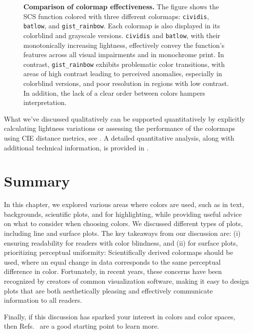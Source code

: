 \begin{figure}
	\centering
	
	\caption{\textbf{Comparison of colormap effectiveness.} The figure shows the SCS function colored with three different colormaps: \texttt{cividis}, \texttt{batlow}, and \texttt{gist\_rainbow}. Each colormap is also displayed in its colorblind and grayscale versions. \texttt{cividis} and \texttt{batlow}, with their monotonically increasing lightness, effectively convey the function's features across all visual impairments and in monochrome print. In contrast, \texttt{gist\_rainbow} exhibits problematic color transitions, with areas of high contrast leading to perceived anomalies, especially in colorblind versions, and poor resolution in regions with low contrast. In addition, the lack of a clear order between colors hampers interpretation.}
	\label{fig:sensitivityCVD}
\end{figure}

What we've discussed qualitatively can be supported quantitatively by explicitly calculating lightness variations or assessing the performance of the colormaps using CIE distance metrics, see . A detailed quantitative analysis, along with additional technical information, is provided in .

\section{Summary}
In this chapter, we explored various areas where colors are used, such as in text, backgrounds, scientific plots, and for highlighting, while providing useful advice on what to consider when choosing colors. We discussed different types of plots, including line and surface plots. The key takeaways from our discussion are: (i) ensuring readability for readers with color blindness, and (ii) for surface plots, prioritizing perceptual uniformity: Scientifically derived colormaps should be used, where an equal change in data corresponds to the same perceptual difference in color. Fortunately, in recent years, these concerns have been recognized by creators of common visualization software, making it easy to design plots that are both aesthetically pleasing and effectively communicate information to all readers.

Finally, if this discussion has sparked your interest in colors and color spaces, then Refs.~\cite{kovesi2015,moreland2015,moreland2009,crameri2020} are a good starting point to learn more.